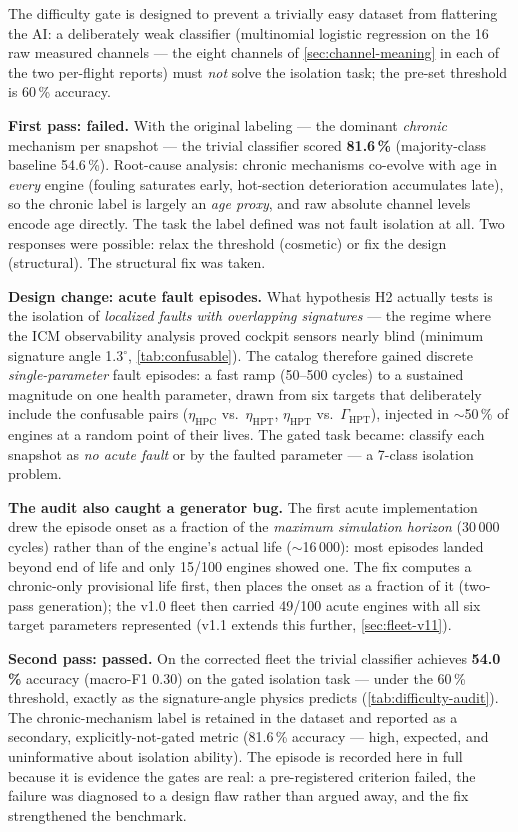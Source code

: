 The difficulty gate is designed to prevent a trivially easy dataset from flattering the AI: a
deliberately weak classifier (multinomial logistic regression on the 16 raw measured channels
--- the eight channels of \cref{sec:channel-meaning} in each of the two per-flight reports)
must \emph{not} solve the isolation task; the pre-set threshold is 60\,\% accuracy.

\textbf{First pass: failed.} With the original labeling --- the dominant \emph{chronic}
mechanism per snapshot --- the trivial classifier scored \textbf{81.6\,\%} (majority-class
baseline 54.6\,\%). Root-cause analysis: chronic mechanisms co-evolve with age in \emph{every}
engine (fouling saturates early, hot-section deterioration accumulates late), so the chronic
label is largely an \emph{age proxy}, and raw absolute channel levels encode age directly. The
task the label defined was not fault isolation at all. Two responses were possible: relax the
threshold (cosmetic) or fix the design (structural). The structural fix was taken.

\textbf{Design change: acute fault episodes.} What hypothesis H2 actually tests is the
isolation of \emph{localized faults with overlapping signatures} --- the regime where the ICM
observability analysis proved cockpit sensors nearly blind (minimum signature angle
1.3$^{\circ}$, \cref{tab:confusable}). The catalog therefore gained discrete
\emph{single-parameter} fault episodes: a fast ramp (50--500 cycles) to a sustained magnitude
on one health parameter, drawn from six targets that deliberately include the confusable pairs
($\eta_{\mathrm{HPC}}$ vs.\ $\eta_{\mathrm{HPT}}$, $\eta_{\mathrm{HPT}}$ vs.\
$\Gamma_{\mathrm{HPT}}$), injected in $\sim$50\,\% of engines at a random point of their lives.
The gated task became: classify each snapshot as \emph{no acute fault} or by the faulted
parameter --- a 7-class isolation problem.

\textbf{The audit also caught a generator bug.} The first acute implementation drew the episode
onset as a fraction of the \emph{maximum simulation horizon} (30\,000 cycles) rather than of
the engine's actual life ($\sim$16\,000): most episodes landed beyond end of life and only
15/100 engines showed one. The fix computes a chronic-only provisional life first, then places
the onset as a fraction of it (two-pass generation); the v1.0 fleet then carried 49/100 acute engines
with all six target parameters represented (v1.1 extends this further,
\cref{sec:fleet-v11}).

\textbf{Second pass: passed.} On the corrected fleet the trivial classifier achieves
\textbf{54.0\,\%} accuracy (macro-F1 0.30) on the gated isolation task --- under the 60\,\%
threshold, exactly as the signature-angle physics predicts (\cref{tab:difficulty-audit}). The
chronic-mechanism label is retained in the dataset and reported as a secondary,
explicitly-not-gated metric (81.6\,\% accuracy --- high, expected, and uninformative about
isolation ability). The episode is recorded here in full because it is evidence the gates are
real: a pre-registered criterion failed, the failure was diagnosed to a design flaw rather than
argued away, and the fix strengthened the benchmark.

